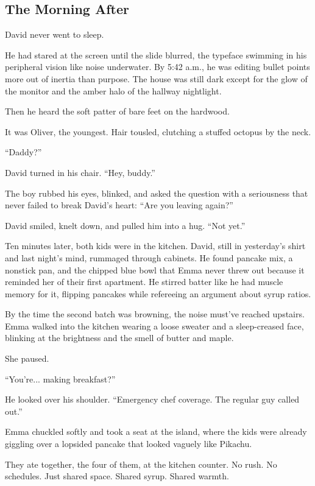 \subsection{The Morning After}

David never went to sleep.

He had stared at the screen until the slide blurred, the typeface swimming in his peripheral vision 
like noise underwater. By 5:42 a.m., he was editing bullet points more out of inertia than purpose. 
The house was still dark except for the glow of the monitor and the amber halo of the hallway nightlight.

Then he heard the soft patter of bare feet on the hardwood.

It was Oliver, the youngest. Hair tousled, clutching a stuffed octopus by the neck.

“Daddy?”

David turned in his chair. “Hey, buddy.”

The boy rubbed his eyes, blinked, and asked the question with a seriousness that never failed to break 
David’s heart: “Are you leaving again?”

David smiled, knelt down, and pulled him into a hug. “Not yet.”

Ten minutes later, both kids were in the kitchen. David, still in yesterday’s shirt and last night’s mind, 
rummaged through cabinets. He found pancake mix, a nonstick pan, and the chipped blue bowl that Emma never 
threw out because it reminded her of their first apartment. He stirred batter like he had muscle memory 
for it, flipping pancakes while refereeing an argument about syrup ratios.

By the time the second batch was browning, the noise must’ve reached upstairs. Emma walked into the kitchen 
wearing a loose sweater and a sleep-creased face, blinking at the brightness and the smell of butter and maple.

She paused.

“You’re... making breakfast?”

He looked over his shoulder. “Emergency chef coverage. The regular guy called out.”

Emma chuckled softly and took a seat at the island, where the kids were already giggling over a lopsided 
pancake that looked vaguely like Pikachu.

They ate together, the four of them, at the kitchen counter. No rush. No schedules. Just shared space. Shared 
syrup. Shared warmth.

